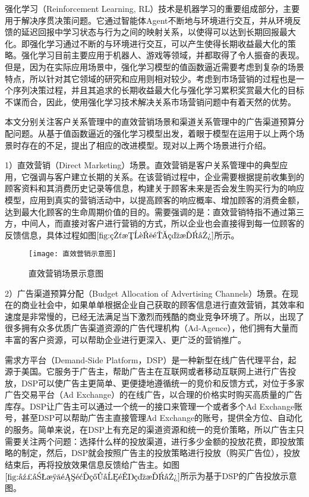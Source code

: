 强化学习（Reinforcement Learning, RL）技术是机器学习的重要组成部分，主要用于解决序贯决策问题。它通过智能体Agent不断地与环境进行交互，并从环境反馈的延迟回报中学习状态与行为之间的映射关系，以使得可以达到长期回报最大化。即强化学习通过不断的与环境进行交互，可以产生使得长期收益最大化的策略。强化学习目前主要应用于机器人、游戏等领域，并都取得了令人振奋的表现。但是，因为在实际应用场景中，强化学习模型的值函数逼近需要考虑到复杂的场景特点，所以针对其它领域的研究和应用则相对较少。考虑到市场营销的过程也是一个序列决策过程，并且其追求的长期收益最大化与强化学习累积奖赏最大化的目标不谋而合，因此，使用强化学习技术解决关系市场营销问题中有着天然的优势。

本文分别关注客户关系管理中的直效营销场景和渠道关系管理中的广告渠道预算分配问题。从基于值函数逼近的强化学习模型出发，着眼于模型在运用于以上两个场景时存在的不足，提出了相应的改进模型。现对以上两个场景进行介绍。

1）直效营销（Direct Marketing）场景。直效营销是客户关系管理中的典型应用，它强调与客户建立长期的关系。在该营销过程中，企业需要根据提前收集到的顾客资料和其消费历史记录等信息，构建关于顾客未来是否会发生购买行为的响应模型，应用到真实的营销活动中，以提高顾客的响应概率、增加顾客的消费金额，达到最大化顾客的生命周期价值的目的。需要强调的是：直效营销特指不通过第三方，中间人，而直接对客户进行营销的方式，所以企业也会直接得到每一位顾客的反馈信息，具体过程如图$\ref{fig:直效营销示意图}$所示。
\begin{figure}[htbp]
\centering
\texttt{[image: 直效营销示意图]}
\caption{直效营销场景示意图}
\label{fig:直效营销示意图}
\end{figure}

2）广告渠道预算分配（Budget Allocation of Advertising Channels）场景。在现在的商业社会中，如果单单根据企业自己获取的顾客信息进行直效营销，其效率和速度是非常慢的，已经无法满足当下激烈而残酷的商业竞争环境了。所以，出现了很多拥有众多优质广告渠道资源的广告代理机构（Ad-Agence），他们拥有大量而丰富的客户资源，可以帮助企业进行更深入、更广泛的营销推广。

需求方平台（Demand-Side Platform，DSP）是一种新型在线广告代理平台，起源于美国。它服务于广告主，帮助广告主在互联网或者移动互联网上进行广告投放，DSP可以使广告主更简单、更便捷地遵循统一的竞价和反馈方式，对位于多家广告交易平台（Ad Exchange）的在线广告，以合理的价格实时购买高质量的广告库存。DSP让广告主可以通过一个统一的接口来管理一个或者多个Ad Exchange账号，甚至DSP可以帮助广告主直接管理Ad Exchange的账号，提供全方位、自动化的服务。简单来说，在DSP上有充足的渠道资源和统一的竞价策略，所以广告主只需要关注两个问题：选择什么样的投放渠道，进行多少金额的投放花费，即投放策略的制定，然后，DSP就会按照广告主的投放策略进行投放（购买广告位），投放结束后，再将投放效果信息反馈给广告主。如图$\ref{fig:广告渠道预算分配示意图}$所示为基于DSP的广告投放示意图。

